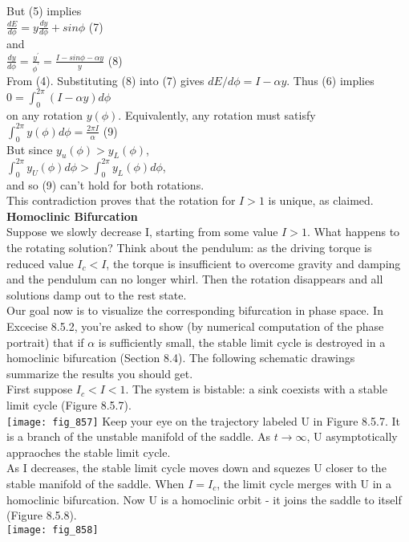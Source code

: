 \documentclass{article}
\newcommand\tab[1][1cm]{\hspace*{#1}}
\begin{document}
But (5) implies \\ \tab \tab
$\frac{dE}{d\phi}=y\frac{dy}{d\phi}+sin \phi$ \tab (7) \\
and \\ \tab \tab
$\frac{dy}{d\phi}=\frac{y^{'}}{\phi^{'}}=\frac{I-sin\phi - \alpha y}{y}$ \tab (8) \\ 
From (4). Substituting (8) into (7) gives $dE/d\phi=I- \alpha y$. Thus (6) implies \\ \tab \tab
$0 = \int_{0}^{2\pi} (I-\alpha y)d\phi$ \\ 
on any rotation $y(\phi)$. Equivalently, any rotation must satisfy \\ \tab \tab
$\int_{0}^{2\pi}y(\phi)d\phi = \frac{2\pi I}{\alpha}$ \tab (9) \\
But since $y_{u}(\phi)>y_{L}(\phi)$, \\ \tab \tab
$\int_{0}^{2\pi}y_{U}(\phi)d\phi > \int_{0}^{2\pi}y_{L}(\phi)d\phi$, \\
and so (9) can't hold for both rotations. \\ \tab
This contradiction proves that the rotation for $I>1$ is unique, as claimed. 
\textbf {Homoclinic Bifurcation} \\ 
Suppose we slowly decrease I, starting from some value $I>1$. What happens to the rotating solution? Think about the pendulum: as the driving torque is reduced value $I_{c}<I$, the torque is insufficient to overcome gravity and damping and the pendulum can no longer whirl. Then the rotation disappears and all solutions damp out to the rest state. \\ \tab
 Our goal now is to visualize the corresponding bifurcation in phase space. In Excecise 8.5.2, you're asked to show (by numerical computation of the phase portrait) that if $\alpha$ is sufficiently small, the stable limit cycle is destroyed in a homoclinic bifurcation (Section 8.4). The following schematic drawings summarize the results you should get. \\ \tab
First suppose $I_{c} < I < 1$. The system is bistable: a sink coexists with a stable limit cycle (Figure 8.5.7). \\
\texttt{[image: fig\_857]} 
Keep your eye on the trajectory labeled U in Figure 8.5.7. It is a branch of the unstable manifold of the saddle. As $t \to \infty$, U asymptotically appraoches the stable limit cycle. \\ \tab
As I decreases, the stable limit cycle moves down and squezes U closer to the stable manifold of the saddle. When $I=I_{c}$, the limit cycle merges with U in a homoclinic bifurcation. Now U is a homoclinic orbit - it joins the saddle to itself (Figure 8.5.8). \\
\texttt{[image: fig\_858]}
\end{document}
